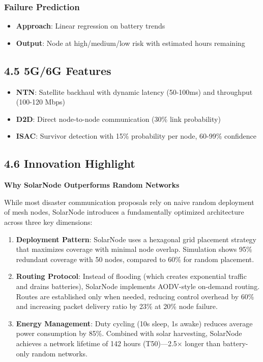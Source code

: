 \documentclass[12pt,a4paper]{article}
\begin{document}
\subsubsection*{Failure Prediction}
\begin{itemize}
    \item \textbf{Approach}: Linear regression on battery trends
    \item \textbf{Output}: Node at high/medium/low risk with estimated hours remaining
\end{itemize}

\subsection*{4.5 5G/6G Features}

\begin{itemize}
    \item \textbf{NTN}: Satellite backhaul with dynamic latency (50-100ms) and throughput (100-120 Mbps)
    \item \textbf{D2D}: Direct node-to-node communication (30\% link probability)
    \item \textbf{ISAC}: Survivor detection with 15\% probability per node, 60-99\% confidence
\end{itemize}

\subsection*{4.6 Innovation Highlight}

\textbf{Why SolarNode Outperforms Random Networks}

While most disaster communication proposals rely on naive random deployment of mesh nodes, SolarNode introduces a fundamentally optimized architecture across three key dimensions:

\begin{enumerate}
    \item \textbf{Deployment Pattern}: SolarNode uses a hexagonal grid placement strategy that maximizes coverage with minimal node overlap. Simulation shows 95\% redundant coverage with 50 nodes, compared to 60\% for random placement.
    \item \textbf{Routing Protocol}: Instead of flooding (which creates exponential traffic and drains batteries), SolarNode implements AODV-style on-demand routing. Routes are established only when needed, reducing control overhead by 60\% and increasing packet delivery ratio by 23\% at 20\% node failure.
    \item \textbf{Energy Management}: Duty cycling (10s sleep, 1s awake) reduces average power consumption by 85\%. Combined with solar harvesting, SolarNode achieves a network lifetime of 142 hours (T50)—2.5× longer than battery-only random networks.
\end{enumerate}
\end{document}
